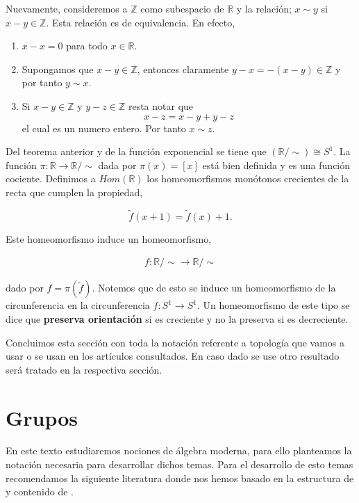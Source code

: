 \begin{ej}\label{ej:Cir_un_coc}
Nuevamente, consideremos a $\mathbb{Z}$ como subespacio de $\mathbb{R}$ y la relación; $x \sim y$ si $x-y \in \mathbb{Z}$. Esta relación es de equivalencia. En efecto, 

\begin{enumerate}
	\item $x-x=0 $ para todo $x \in \mathbb{R}$.
	\item Supongamos que $x-y \in \mathbb{Z}$, entonces claramente $y-x=-(x-y) \in \mathbb{Z}$ y por tanto $y \sim x$.
	\item Si $x-y \in \mathbb{Z}$ y $y-z \in \mathbb{Z}$ resta notar que $$x-z=x-y+y-z$$
el cual es un numero entero. Por tanto $x \sim z$.
	\end{enumerate}


Del teorema anterior y de la función exponencial se tiene que $(\mathbb{R}/\sim) \cong S^1.$ La función  $\pi: \mathbb{R} \to \mathbb{R}/ \sim$ dada por $\pi (x)=[x]$ está bien definida y es una función cociente. Definimos a $Hom(\mathbb{R})$ los homeomorfismos monótonos crecientes de la recta que cumplen la propiedad, 

$$\tilde{f}(x+1)= \tilde{f}(x)+1.$$

Este homeomorfismo induce un homeomorfismo,

\begin{align*}
f:\mathbb{R}/ \sim \to  \mathbb{R}/ \sim
\end{align*}
 
dado por $f=\pi(\tilde{f}).$ Notemos que de esto se induce un homeomorfismo de la circunferencia en la circunferencia $f:S^1 \to S^1$. Un homeomorfismo de este tipo se dice que \textbf{preserva orientación} si es creciente y no la preserva si es decreciente. 
\end{ej}

Concluimos esta sección con toda la notación referente a topología que vamos a usar o se usan en los artículos consultados. En caso dado se use otro resultado será tratado en la respectiva sección. 


\section{Grupos}
En este texto estudiaremos nociones de álgebra moderna, para ello planteamos la notación necesaria para desarrollar dichos temas. Para el desarrollo de esto temas recomendamos la siguiente literatura donde nos hemos basado en la estructura de \cite{alg_grove} y contenido de \cite{alg_ii}.

